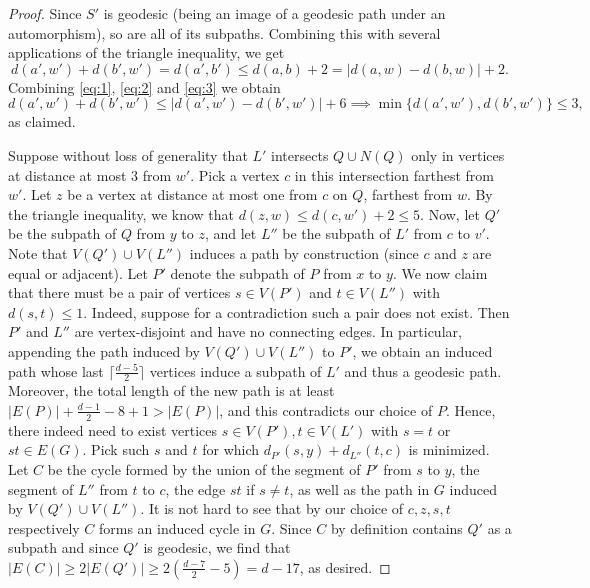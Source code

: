 \documentclass[10pt,a4paper]{amsart}
\begin{document}
\begin{proof}
    Since $S'$ is geodesic (being an image of a geodesic path under an automorphism), so are all of its subpaths. Combining this with several applications of the triangle inequality, we get
    \begin{equation}\label{eq:3}
        d(a', w')+d(b',w')=d(a',b') \le d(a,b)+2 = |d(a,w)-d(b,w)|+2.
    \end{equation} 
    Combining \eqref{eq:1}, \eqref{eq:2} and \eqref{eq:3} we obtain 
	$$d(a',w')+d(b',w') \le |d(a',w')-d(b',w')|+6 \implies \min\{d(a',w'),d(b',w')\}\le 3,$$
	 as claimed.
	
	Suppose without loss of generality
    that $L'$ intersects $Q \cup N(Q)$ only in vertices at distance at most $3$ from $w'$. Pick a vertex $c$ in this intersection farthest from $w'$. Let $z$ be a vertex at distance at most one from $c$ on $Q$, farthest from $w$. By the triangle inequality, we know that $d(z,w) \le d(c,w') +2 \le 5$. Now, let $Q'$ be the subpath of $Q$ from $y$ to $z$, and let $L''$ be the subpath of $L'$ from $c$ to $v'$. Note that $V(Q') \cup V(L'')$ induces a path by construction (since $c$ and $z$ are equal or adjacent). Let $P'$ denote the subpath of $P$ from $x$ to $y$.
    We now claim that there must be a pair of vertices $s\in V(P')$ and $t\in V(L'')$ with $d(s,t)\le 1$. Indeed, suppose for a contradiction such a pair does not exist. Then $P'$ and $L''$ are vertex-disjoint and have no connecting edges. In particular, appending the path induced by $V(Q')\cup V(L'')$ to $P'$, we obtain an induced path whose last $\lceil \frac{d-5}{2}\rceil$ vertices induce a subpath of $L'$ and thus a geodesic path. Moreover, the total length of the new path is at least $|E(P)|+\frac{d-1}{2}-8+1 > |E(P)|$, and this contradicts our choice of $P$. Hence, there indeed need to exist vertices $s\in V(P'), t \in V(L')$ with $s=t$ or $st\in E(G)$. Pick such $s$ and $t$ for which $d_{P'}(s,y)+d_{L''}(t,c)$ is minimized. Let $C$ be the cycle formed by the union of the segment of $P'$ from $s$ to $y$, the segment of $L''$ from $t$ to $c$, the edge $st$ if $s\neq t$, as well as the path in $G$ induced by $V(Q')\cup V(L'')$. It is not hard to see that by our choice of $c,z,s,t$ respectively $C$ forms an induced cycle in $G$. Since $C$ by definition contains $Q'$ as a subpath and since $Q'$ is geodesic, we find that $|E(C)|\ge 2|E(Q')|\geq 2(\frac{d-7}{2}-5)=d-17$, as desired. 
\end{proof}
\end{document}
